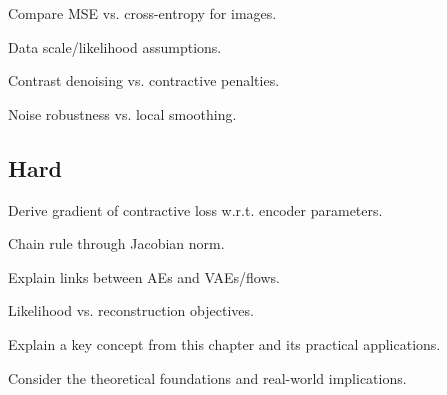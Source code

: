 \begin{exercisebox}[medium]
\begin{problem}
Compare MSE vs. cross-entropy for images.
\end{problem}
\begin{hintbox}
Data scale/likelihood assumptions.
\end{hintbox}
\end{exercisebox}


\begin{exercisebox}[medium]
\begin{problem}
Contrast denoising vs. contractive penalties.
\end{problem}
\begin{hintbox}
Noise robustness vs. local smoothing.
\end{hintbox}
\end{exercisebox}


\subsection*{Hard}

\begin{exercisebox}[hard]
\begin{problem}
Derive gradient of contractive loss w.r.t. encoder parameters.
\end{problem}
\begin{hintbox}
Chain rule through Jacobian norm.
\end{hintbox}
\end{exercisebox}


\begin{exercisebox}[hard]
\begin{problem}
Explain links between AEs and VAEs/flows.
\end{problem}
\begin{hintbox}
Likelihood vs. reconstruction objectives.
\end{hintbox}
\end{exercisebox}



\begin{exercisebox}[hard]
\begin{problem}
Explain a key concept from this chapter and its practical applications.
\end{problem}
\begin{hintbox}
Consider the theoretical foundations and real-world implications.
\end{hintbox}
\end{exercisebox}


